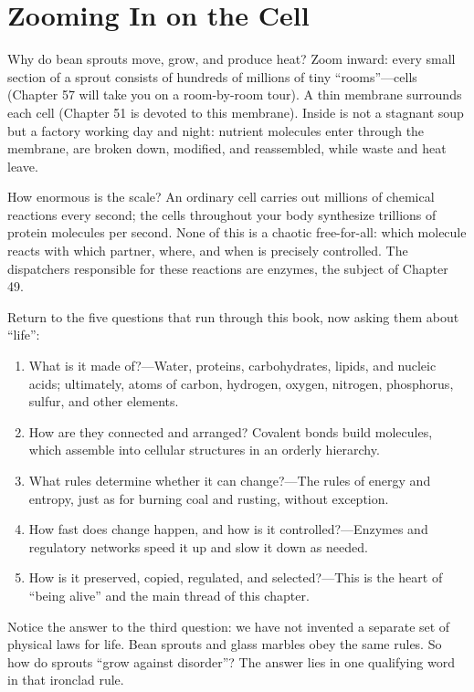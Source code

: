 \section{Zooming In on the Cell}

Why do bean sprouts move, grow, and produce heat? Zoom inward: every small section of a sprout consists of hundreds of millions of tiny ``rooms''---cells (Chapter 57 will take you on a room-by-room tour). A thin membrane surrounds each cell (Chapter 51 is devoted to this membrane). Inside is not a stagnant soup but a factory working day and night: nutrient molecules enter through the membrane, are broken down, modified, and reassembled, while waste and heat leave.

How enormous is the scale? An ordinary cell carries out millions of chemical reactions every second; the cells throughout your body synthesize trillions of protein molecules per second. None of this is a chaotic free-for-all: which molecule reacts with which partner, where, and when is precisely controlled. The dispatchers responsible for these reactions are enzymes, the subject of Chapter 49.

Return to the five questions that run through this book, now asking them about ``life'':

\begin{enumerate}[itemsep=2pt]
\item What is it made of?---Water, proteins, carbohydrates, lipids, and nucleic acids; ultimately, atoms of carbon, hydrogen, oxygen, nitrogen, phosphorus, sulfur, and other elements.
\item How are they connected and arranged? Covalent bonds build molecules, which assemble into cellular structures in an orderly hierarchy.
\item What rules determine whether it can change?---The rules of energy and entropy, just as for burning coal and rusting, without exception.
\item How fast does change happen, and how is it controlled?---Enzymes and regulatory networks speed it up and slow it down as needed.
\item How is it preserved, copied, regulated, and selected?---This is the heart of ``being alive'' and the main thread of this chapter.
\end{enumerate}

Notice the answer to the third question: we have not invented a separate set of physical laws for life. Bean sprouts and glass marbles obey the same rules. So how do sprouts ``grow against disorder''? The answer lies in one qualifying word in that ironclad rule.

